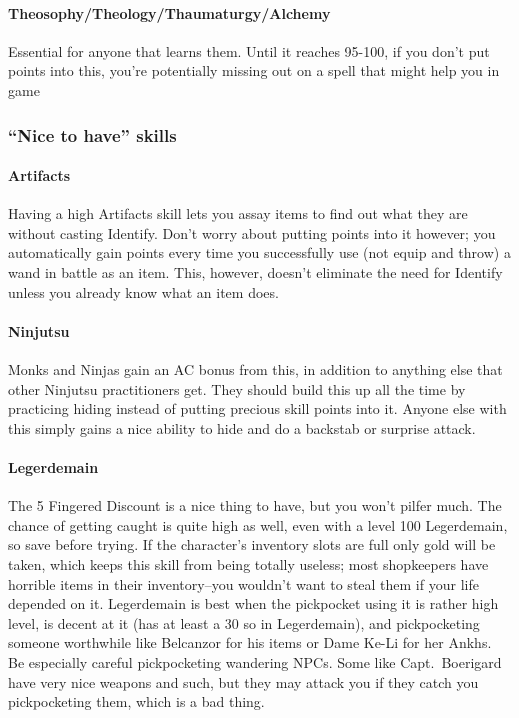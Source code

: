 \documentclass[12pt]{article}
\let\oldparagraph\paragraph
\renewcommand{\paragraph}[1]{\oldparagraph{#1}\mbox{}}
\begin{document}
\paragraph{Theosophy/Theology/Thaumaturgy/Alchemy} Essential for anyone that learns
them. Until it reaches 95-100, if you don't put points into this, you're
potentially missing out on a spell that might help you in game

\subsubsection{\texorpdfstring{``Nice to have''
skills}{Nice to have skills}}\label{nice-to-have-skills}

\paragraph{Artifacts} Having a high Artifacts skill lets you assay items to
find out what they are without casting Identify. Don't worry about putting
points into it however; you automatically gain points every time you
successfully use (not equip and throw) a wand in battle as an item.  This,
however, doesn't eliminate the need for Identify unless you already know what
an item does.

\paragraph{Ninjutsu} Monks and Ninjas gain an AC bonus from this, in addition
to anything else that other Ninjutsu practitioners get. They should build
this up all the time by practicing hiding instead of putting precious skill
points into it. Anyone else with this simply gains a nice ability to hide and
do a backstab or surprise attack.

\paragraph{Legerdemain} The 5 Fingered Discount is a nice thing to have, but
you won't pilfer much. The chance of getting caught is quite high as well,
even with a level 100 Legerdemain, so save before trying. If the character's
inventory slots are full only gold will be taken, which keeps this skill from
being totally useless; most shopkeepers have horrible items in their
inventory--you wouldn't want to steal them if your life depended on
it. Legerdemain is best when the pickpocket using it is rather high level, is
decent at it (has at least a 30 so in Legerdemain), and pickpocketing someone
worthwhile like Belcanzor for his items or Dame Ke-Li for her Ankhs. Be
especially careful pickpocketing wandering NPCs. Some like Capt.~Boerigard
have very nice weapons and such, but they may attack you if they catch you
pickpocketing them, which is a bad thing.
\end{document}
